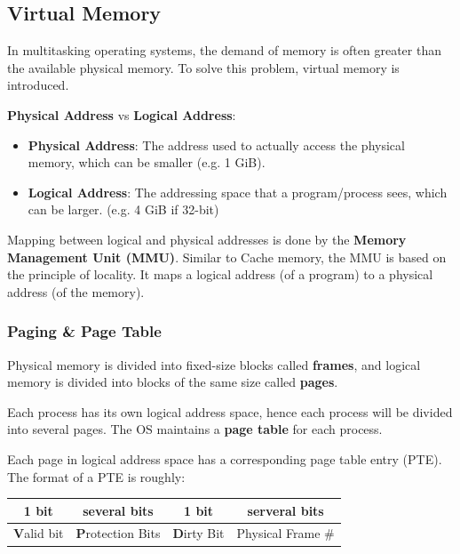 \subsection{Virtual Memory}

In multitasking operating systems, the demand of memory is often greater than the
available physical memory. To solve this problem, virtual memory is introduced.

\textbf{Physical Address} vs \textbf{Logical Address}:
\begin{itemize}
    \item \textbf{Physical Address}: The address used to actually access the physical memory, which can be smaller (e.g. 1 GiB).
    \item \textbf{Logical Address}: The addressing space that a program/process sees, which can be larger. (e.g. 4 GiB if 32-bit)
\end{itemize}

Mapping between logical and physical addresses is done by the \textbf{Memory Management Unit (MMU)}.
Similar to Cache memory, the MMU is based on the principle of locality.
It maps a logical address (of a program) to a physical address (of the memory).

\subsubsection{Paging \& Page Table}

Physical memory is divided into fixed-size blocks called \textbf{frames},
and logical memory is divided into blocks of the same size called \textbf{pages}.

Each process has its own logical address space, hence each process will be divided
into several pages. The OS maintains a \textbf{page table} for each process.

Each page in logical address space has a corresponding page table entry (PTE).
The format of a PTE is roughly:

\begin{table}[H]
    \centering
    \begin{tabular}{cccc}
    1 bit                                & several bits                              & 1 bit                                         & serveral bits                          \\ \hline
    \multicolumn{1}{|c|}{\textbf{V}alid bit} & \multicolumn{1}{c|}{\textbf{P}rotection Bits} & \multicolumn{1}{c|}{\textbf{D}irty Bit} & \multicolumn{1}{c|}{Physical Frame \#} \\ \hline           
    \end{tabular}
\end{table}

